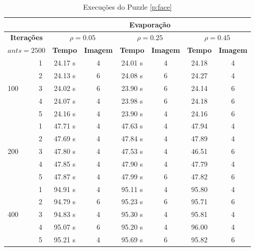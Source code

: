\documentclass{article}
\begin{document}
\begin{table}[h]
    \centering
    \begin{tabular}{|lc|cc|cc|cc|} \hline
        && \multicolumn{6}{|c|}{\bfseries Evaporação} \\\hline
        \multicolumn{2}{|c|}{\bfseries Iterações}
            & \multicolumn{2}{|c|}{$\rho = 0.05$}
            & \multicolumn{2}{|c|}{$\rho = 0.25$}
            & \multicolumn{2}{|c|}{$\rho = 0.45$} \\\hline
        \multicolumn{2}{|c|}{$ants = 2500$}
            & \textbf{Tempo} & \textbf{Imagem}
            & \textbf{Tempo} & \textbf{Imagem}
            & \textbf{Tempo} & \textbf{Imagem} \\\hline
        \multirow{5}{*}{100}
            & 1 & 24.17 s & 4 & 24.01 s & 4 & 24.18 & 4 \\
            & 2 & 24.13 s & 6 & 24.08 s & 6 & 24.27 & 4 \\
            & 3 & 24.02 s & 6 & 23.90 s & 6 & 24.14 & 6 \\
            & 4 & 24.07 s & 4 & 23.98 s & 6 & 24.18 & 6 \\
            & 5 & 24.16 s & 4 & 23.90 s & 4 & 24.16 & 6 \\\hline
        \multirow{5}{*}{200}
            & 1 & 47.71 s & 4 & 47.63 s & 4 & 47.94 & 4 \\
            & 2 & 47.69 s & 4 & 47.84 s & 4 & 47.89 & 4 \\
            & 3 & 47.80 s & 4 & 47.53 s & 4 & 46.51 & 6 \\
            & 4 & 47.85 s & 4 & 47.90 s & 4 & 47.79 & 4 \\
            & 5 & 47.87 s & 4 & 47.99 s & 6 & 47.82 & 6 \\\hline
        \multirow{5}{*}{400}
            & 1 & 94.91 s & 4 & 95.11 s & 4 & 95.80 & 4 \\
            & 2 & 94.79 s & 6 & 95.23 s & 6 & 95.71 & 6 \\
            & 3 & 94.83 s & 4 & 95.30 s & 4 & 95.81 & 4 \\
            & 4 & 95.07 s & 6 & 95.20 s & 4 & 96.00 & 4 \\
            & 5 & 95.21 s & 4 & 95.69 s & 6 & 95.82 & 6 \\\hline
    \end{tabular}
    \caption{Execuções do Puzzle \ref{p:face}}
    \label{te:face}
\end{table}
\end{document}
